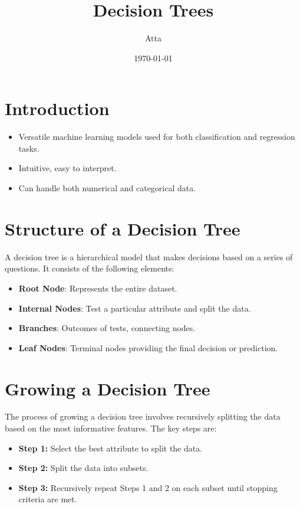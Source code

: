 \documentclass{article}
\title{Decision Trees}
\author{Atta}
\date{\today}
\begin{document}
\maketitle

\section*{Introduction}
\begin{itemize}
\item Versatile machine learning models used for both classification and regression tasks.
\item  Intuitive, easy to interpret.
\item  Can handle both numerical and categorical data. 
\end{itemize}


\section*{Structure of a Decision Tree}
A decision tree is a hierarchical model that makes decisions based on a series of questions. It consists of the following elements:
\begin{itemize}
    \item \textbf{Root Node}: Represents the entire dataset.
    \item \textbf{Internal Nodes}: Test a particular attribute and split the data.
    \item \textbf{Branches}: Outcomes of tests, connecting nodes.
    \item \textbf{Leaf Nodes}: Terminal nodes providing the final decision or prediction.
\end{itemize}

\section*{Growing a Decision Tree}
The process of growing a decision tree involves recursively splitting the data based on the most informative features. The key steps are:
\begin{itemize}
    \item \textbf{Step 1:} Select the best attribute to split the data.
    \item \textbf{Step 2:} Split the data into subsets.
    \item \textbf{Step 3:} Recursively repeat Steps 1 and 2 on each subset until stopping criteria are met.
\end{itemize}
\end{document}
